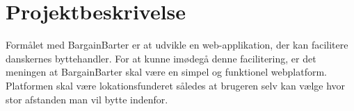 \chapter{Projektbeskrivelse}\label{ch:Projektbeskrivelse}
Formålet med BargainBarter er at udvikle en web-applikation, der kan facilitere danskernes byttehandler.  For at kunne imødegå denne facilitering, er det meningen at BargainBarter skal være en simpel og funktionel webplatform. Platformen skal være lokationsfunderet således at brugeren selv kan vælge hvor stor afstanden man vil bytte indenfor. 



